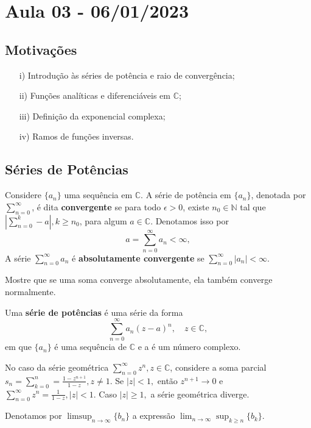 \documentclass[ComplexAnalysis/complex.tex]{subfiles}
\begin{document}
\section{Aula 03 - 06/01/2023}
\subsection{Motivações}
\begin{itemize}
	\item[i)] Introdução às séries de potência e raio de convergência;
	\item[ii)] Funções analíticas e diferenciáveis em $\mathbb{C}$;
	\item[iii)] Definição da exponencial complexa;
	\item[iv)] Ramos de funções inversas.
\end{itemize}
\subsection{Séries de Potências}
\begin{def*}
	Considere $\{a_{n}\}$ uma sequência em $\mathbb{C}$. A série de potência em $\{a_n\}$, denotada
	por $\sum\limits_{n=0}^{\infty}$, é dita \textbf{convergente} se para todo $\epsilon > 0$, existe $n_0\in\mathbb{N}$
	tal que $|\sum\limits_{n=0}^{k} - a|, k\geq{n_0}$, para algum $a\in\mathbb{C}$. Denotamos isso por
	$$
		a = \sum_{n=0}^{\infty} a_n < \infty,
	$$
	A série $\sum\limits_{n=0}^{\infty}a_n$ é \textbf{absolutamente convergente} se $\sum\limits_{n=0}^{\infty}|a_n|<\infty$.
\end{def*}
\begin{exer*}
	Mostre que se uma soma converge absolutamente, ela também converge normalmente.
\end{exer*}
\begin{def*}
	Uma \textbf{série de potências} é uma série da forma
	$$
		\sum_{n=0}^{\infty}a_n(z-a)^n, \quad z\in\mathbb{C},
	$$
	em que $\{a_n\}$ é uma sequência de $\mathbb{C}$ e a é um número complexo.
\end{def*}
\begin{example}
	No caso da série geométrica $\sum\limits_{n=0}^{\infty}z^n, z\in\mathbb{C}$, considere
	a soma parcial $s_n = \sum\limits_{k=0}^{n} = \frac{1 - z^{n+1}}{1-z}, z\neq{1}.$ Se
	$|z| < 1,$ então $z^{n+1}\to{0}$ e $\sum\limits_{n=0}^{\infty}z^n = \frac{1}{1-z}, |z| < 1.$
	Caso $|z|\geq{1},$ a série geométrica diverge.
\end{example}
Denotamos por $\limsup_{n\to\infty}\{b_n\}$ a expressão $\lim_{n\to\infty}\sup_{k\geq{n}}\{b_k\}$.
\end{document}
